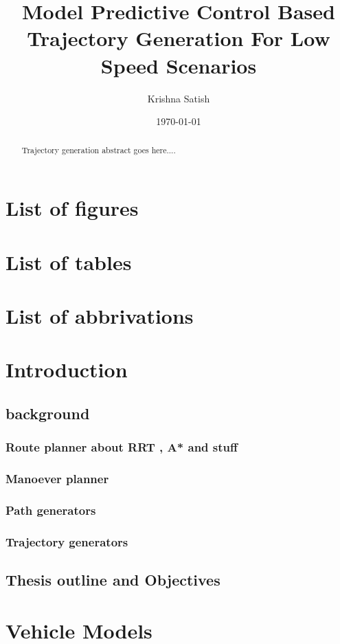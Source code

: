 \documentclass{article}
\title{Model Predictive Control Based Trajectory Generation For Low Speed Scenarios}
\author{Krishna Satish}
\date{\today}
\begin{document}
\maketitle
\newpage
\begin{abstract}
    Trajectory generation abstract goes here....
\end{abstract}
\newpage
\tableofcontents



\begin{titlepage}
    \section{List of figures}
    \section{List of tables}
    \section{List of abbrivations}

    \section{Introduction}
    \subsection{background}
    \subsubsection{Route planner about RRT , A* and stuff}
    \subsubsection{Manoever planner}
    \subsubsection{Path generators}
    \subsubsection{Trajectory generators}
    \subsection{Thesis outline and Objectives}

    \section{Vehicle Models}

\end{titlepage}
\end{document}
